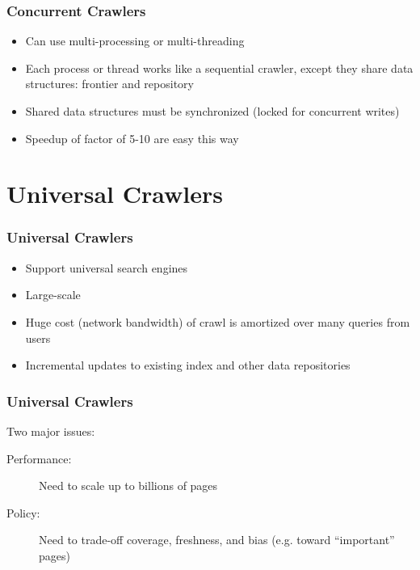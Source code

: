 \documentclass{beamer}
\begin{document}
\begin{frame} \frametitle{Concurrent Crawlers}
\begin{itemize}
\item Can use multi-processing or multi-threading
\item Each process or thread works like a sequential crawler, except they share data structures: frontier and repository
\item Shared data structures must be synchronized (locked for concurrent writes)
\item Speedup of factor of 5-10 are easy this way
\end{itemize}

\end{frame}


\section{Universal Crawlers}


\begin{frame} \frametitle{Universal Crawlers}

\begin{itemize}

\item Support universal search engines

\item Large-scale

\item Huge cost (network bandwidth) of crawl is amortized over many queries from users

\item Incremental updates to existing index and other data repositories
\end{itemize}


\end{frame}

\begin{frame} \frametitle{Universal Crawlers}


\begin{block}{Two major issues:}

\begin{description}
\item[Performance:] Need to scale up to billions of pages
\item[Policy:] Need to trade-off coverage, freshness, and bias (e.g. toward ``important'' pages)
\end{description}

\end{block}

\end{frame}
\end{document}
